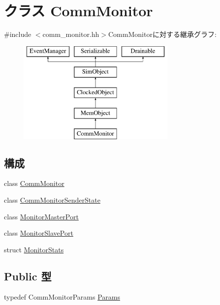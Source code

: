 \hypertarget{classCommMonitor}{
\section{クラス CommMonitor}
\label{classCommMonitor}
}


{\ttfamily \#include $<$comm\_\-monitor.hh$>$}CommMonitorに対する継承グラフ:\begin{figure}[H]
\begin{center}
\leavevmode
\includegraphics[height=5cm]{classCommMonitor}
\end{center}
\end{figure}
\subsection*{構成}
\begin{DoxyCompactItemize}
\item 
class \hyperlink{classCommMonitor_1_1CommMonitor}{CommMonitor}
\item 
class \hyperlink{classCommMonitor_1_1CommMonitorSenderState}{CommMonitorSenderState}
\item 
class \hyperlink{classCommMonitor_1_1MonitorMasterPort}{MonitorMasterPort}
\item 
class \hyperlink{classCommMonitor_1_1MonitorSlavePort}{MonitorSlavePort}
\item 
struct \hyperlink{structCommMonitor_1_1MonitorStats}{MonitorStats}
\end{DoxyCompactItemize}
\subsection*{Public 型}
\begin{DoxyCompactItemize}
\item 
typedef CommMonitorParams \hyperlink{classCommMonitor_a945848d2cb95179e45fffc6a7f41da84}{Params}
\end{DoxyCompactItemize}
